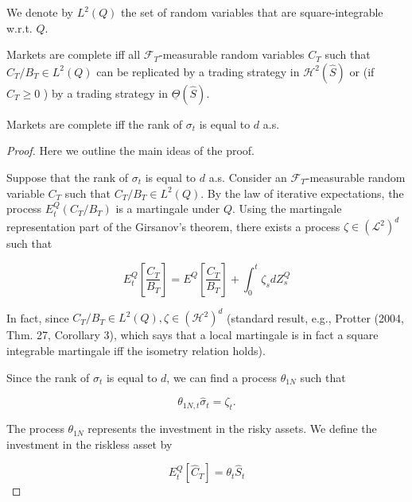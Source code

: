 \documentclass[\topdir/lecture\_notes.tex]{subfiles}
\begin{document}
We denote by $L^{2}(Q)$ the set of random variables that are square-integrable w.r.t. $Q$.

\begin{defn}\label{def:6.2.1}
Markets are complete iff all $\mathcal{F}_{T}$-measurable random variables $C_{T}$ such that $C_{T} / B_{T} \in L^{2}(Q)$ can be replicated by a trading strategy in $\mathcal{H}^{2}(\hat{S})$ or (if $C_{T} \geq 0$ ) by a trading strategy in $\underline{\Theta}(\hat{S})$.
\end{defn}

\begin{theorem}\label{thm:6.2.1}
Markets are complete iff the rank of $\sigma_{t}$ is equal to $d$ a.s.
\end{theorem}

\begin{proof}
Here we outline the main ideas of the proof.

Suppose that the rank of $\sigma_{t}$ is equal to $d$ a.s. Consider an $\mathcal{F}_{T}$-measurable random variable $C_{T}$ such that $C_{T} / B_{T} \in L^{2}(Q)$. By the law of iterative expectations, the process $E_{t}^{Q}\left(C_{T} / B_{T}\right)$ is a martingale under $Q$. Using the martingale representation part of the Girsanov's theorem, there exists a process $\zeta \in\left(\mathcal{L}^{2}\right)^{d}$ such that

\begin{equation}
E_{t}^{Q}\left[\frac{C_{T}}{B_{T}}\right]=E^{Q}\left[\frac{C_{T}}{B_{T}}\right]+\int_{0}^{t} \zeta_{s} d Z_{s}^{Q} \label{eq:6.2.1}
\end{equation}

In fact, since $C_{T} / B_{T} \in L^{2}(Q), \zeta \in\left(\mathcal{H}^{2}\right)^{d}$ (standard result, e.g., Protter (2004, Thm. 27, Corollary 3), which says that a local martingale is in fact a square integrable martingale iff the isometry relation holds).

Since the rank of $\sigma_{t}$ is equal to $d$, we can find a process $\theta_{1 N}$ such that

\begin{equation}
\theta_{1 N, t} \hat{\sigma}_{t}=\zeta_{t} . \label{eq:6.2.2}
\end{equation}

The process $\theta_{1 N}$ represents the investment in the risky assets. We define the investment in the riskless asset by

\begin{equation}
E_{t}^{Q}\left[\hat{C}_{T}\right]=\theta_{t} \hat{S}_{t} \label{eq:6.2.3}
\end{equation}


\end{proof}
\end{document}
